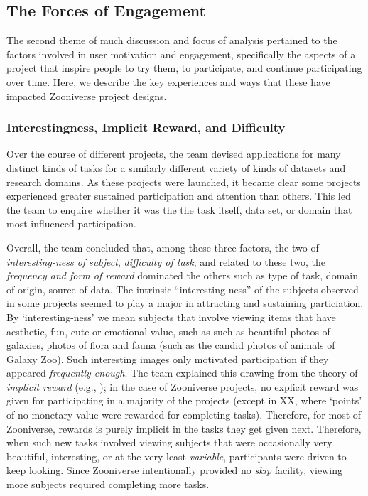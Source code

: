 \documentclass{sigchi}
\begin{document}
\subsection{The Forces of Engagement}

The second theme of much discussion and focus of analysis pertained to the factors involved in user motivation and engagement, specifically the aspects of a project that inspire people to try them, to participate, and continue participating over time. Here, we describe the key experiences and ways that these have impacted Zooniverse project designs.

\subsubsection{Interestingness, Implicit Reward, and Difficulty} 

Over the course of different projects, the team devised applications for many distinct kinds of tasks for a similarly different variety of kinds of datasets and research domains.  As these projects were launched, it became clear some projects experienced greater sustained participation and attention than others.  This led the team to enquire whether it was the the task itself, data set, or domain that most influenced participation.  

Overall, the team concluded that, among these three factors, the two of \emph{interesting-ness of subject}, \emph{difficulty of task}, and related to these two, the \emph{frequency and form of reward} dominated the others such as type of task, domain of origin, source of data.  The intrinsic ``interesting-ness'' of the subjects observed in some projects seemed to play a major in attracting and sustaining particiation.  By `interesting-ness' we mean subjects that involve viewing items that have aesthetic, fun, cute or emotional value, such as such as beautiful photos of galaxies, photos of flora and fauna (such as the candid photos of animals of Galaxy Zoo).  Such interesting images only motivated participation if they appeared \emph{frequently enough}.  The team explained this drawing from the theory of \emph{implicit reward} (e.g., \cite{implicitreward}); in the case of Zooniverse projects, no explicit reward was given for participating in a majority of the projects (except in XX, where `points' of no monetary value were rewarded for completing tasks).  Therefore, for most of Zooniverse, rewards is purely implicit in the tasks they get given next.  Therefore, when such new tasks involved viewing subjects that were occasionally very beautiful, interesting, or at the very least \emph{variable}, participants were driven to keep looking.  Since Zooniverse intentionally provided no \emph{skip} facility, viewing more subjects required completing more tasks.
\end{document}
